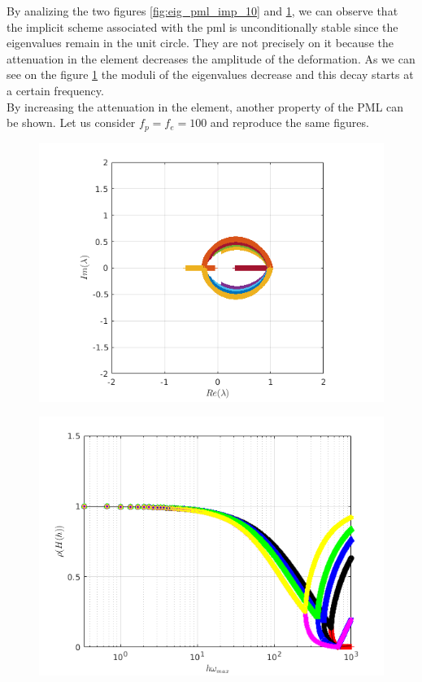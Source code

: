\begin{itemize}
\begin{figure}[H]
\begin{minipage}{.5\textwidth}
  \label{fig:spect_rad_pml_imp_10}
\end{minipage}
\end{figure} 
By analizing the two figures \ref{fig:eig_pml_imp_10} and \ref{fig:spect_rad_pml_imp_10}, we can observe that the implicit scheme associated with the pml is unconditionally stable since the eigenvalues remain in the unit circle. They are not precisely on it because the attenuation in the element decreases the amplitude of the deformation. As we can see on the figure \ref{fig:spect_rad_pml_imp_10} the moduli of the eigenvalues decrease and this decay starts at a certain frequency.\\
By increasing the attenuation in the element, another property of the PML can be shown. Let us consider $f_p = f_e = 100$ and reproduce the same figures. 
\begin{figure}[H]
\centering
\begin{minipage}{.5\textwidth}
  \centering
  \includegraphics[width=1.\linewidth]{images/eig_pml_imp_100.png}
  \label{fig:eig_pml_imp_100}
\end{minipage}%
\begin{minipage}{.5\textwidth}
  \centering
  \includegraphics[width=1.\linewidth]{images/spect_rad_pml_imp_100.png}

\end{minipage}
\end{figure}
\end{itemize}
